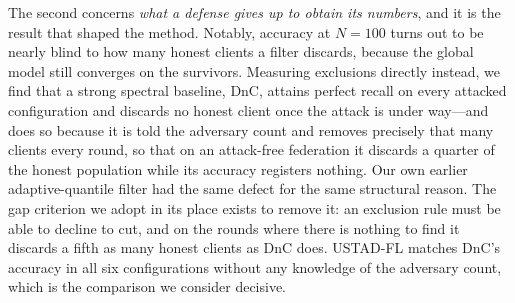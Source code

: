 \documentclass[journal]{IEEEtran}
\begin{document}
The second concerns \emph{what a defense gives up to obtain its numbers}, and it is the result that shaped the method. Notably, accuracy at $N=100$ turns out to be nearly blind to how many honest clients a filter discards, because the global model still converges on the survivors. Measuring exclusions directly instead, we find that a strong spectral baseline, DnC, attains perfect recall on every attacked configuration and discards no honest client once the attack is under way---and does so because it is told the adversary count and removes precisely that many clients every round, so that on an attack-free federation it discards a quarter of the honest population while its accuracy registers nothing. Our own earlier adaptive-quantile filter had the same defect for the same structural reason. The gap criterion we adopt in its place exists to remove it: an exclusion rule must be able to decline to cut, and on the rounds where there is nothing to find it discards a fifth as many honest clients as DnC does. USTAD-FL matches DnC's accuracy in all six configurations without any knowledge of the adversary count, which is the comparison we consider decisive.
\end{document}

